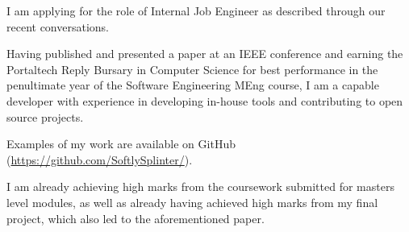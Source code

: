 \documentclass[10pt,stdletter,dateno,sigleft]{newlfm} %
\begin{document}
\begin{newlfm}




I am applying for the role of Internal Job Engineer as described through our recent conversations.


Having published and presented a paper at an IEEE conference and earning the
Portaltech Reply Bursary in Computer Science for best performance in the
penultimate year of the Software Engineering MEng course, I am a capable
developer with experience in developing in-house tools and contributing to
open source projects.

Examples of my work are available on GitHub 
(\url{https://github.com/SoftlySplinter/}). 

I am already achieving high marks from the coursework submitted for masters
level modules, as well as already having achieved high marks from my final
project, which also led to the aforementioned paper.


\end{newlfm}
\end{document}
